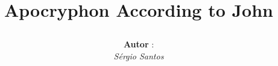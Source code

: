 \begin{titlepage}
	\title{
		\emptyline
		\begin{center}
		 	Apocryphon According to John
		\end{center}		
	}
	\author{
		\begin{minipage}{1\linewidth}
			\begin{minipage}{0.4\linewidth}
				\flushleft
				\textbf{Autor} : \\
				\emph{S\'{e}rgio Santos} \\ %
			\end{minipage}
			\hspace{0.1\linewidth}
		\end{minipage}
		\minipagespace{2cm}
	}
	\date{}
\end{titlepage}
